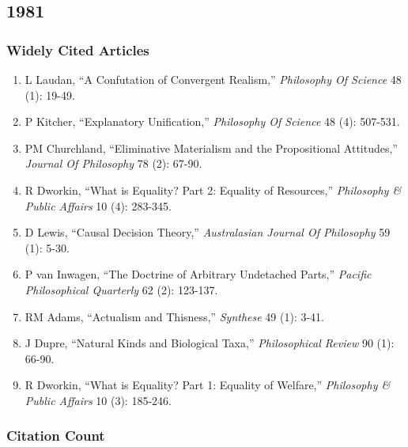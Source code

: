 \documentclass[
  10pt,
  letterpaper,
  DIV=11,
  numbers=noendperiod,
  twoside]{scrartcl}
\providecommand{\tightlist}{%
  \setlength{\itemsep}{0pt}\setlength{\parskip}{0pt}}\usepackage{longtable,booktabs,array}
\begin{document}
\newpage

\subsection{1981}\label{sec-s1981}

\subsubsection*{Widely Cited Articles}\label{widely-cited-articles-5}

\begin{enumerate}
\def\labelenumi{\arabic{enumi}.}
\tightlist
\item
  L Laudan, ``A Confutation of Convergent Realism,'' \emph{Philosophy Of
  Science} 48 (1): 19-49.
\item
  P Kitcher, ``Explanatory Unification,'' \emph{Philosophy Of Science}
  48 (4): 507-531.
\item
  PM Churchland, ``Eliminative Materialism and the Propositional
  Attitudes,'' \emph{Journal Of Philosophy} 78 (2): 67-90.
\item
  R Dworkin, ``What is Equality? Part 2: Equality of Resources,''
  \emph{Philosophy \& Public Affairs} 10 (4): 283-345.
\item
  D Lewis, ``Causal Decision Theory,'' \emph{Australasian Journal Of
  Philosophy} 59 (1): 5-30.
\item
  P van Inwagen, ``The Doctrine of Arbitrary Undetached Parts,''
  \emph{Pacific Philosophical Quarterly} 62 (2): 123-137.
\item
  RM Adams, ``Actualism and Thisness,'' \emph{Synthese} 49 (1): 3-41.
\item
  J Dupre, ``Natural Kinds and Biological Taxa,'' \emph{Philosophical
  Review} 90 (1): 66-90.
\item
  R Dworkin, ``What is Equality? Part 1: Equality of Welfare,''
  \emph{Philosophy \& Public Affairs} 10 (3): 185-246.
\end{enumerate}

\subsubsection*{Citation Count}\label{sec-count-1981}
\end{document}
